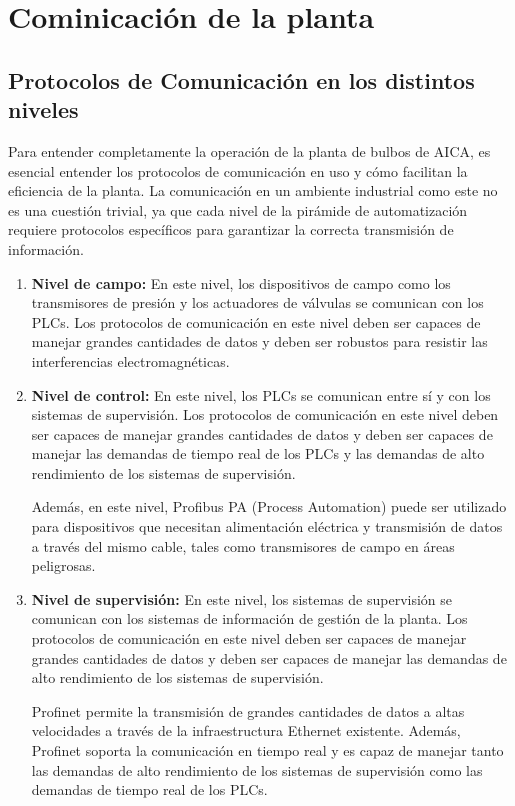 \section{Cominicación de la planta}
\subsection{Protocolos de Comunicación en los distintos niveles}

Para entender completamente la operación de la planta de bulbos de AICA, es esencial entender los protocolos de comunicación en uso y cómo facilitan la eficiencia de la planta. La comunicación en un ambiente industrial como este no es una cuestión trivial, ya que cada nivel de la pirámide de automatización requiere protocolos específicos para garantizar la correcta transmisión de información.\\
\begin{enumerate}
    \item \textbf{Nivel de campo:} En este nivel, los dispositivos de campo
          como los transmisores de presión y los actuadores de válvulas se
          comunican con los PLCs. Los protocolos de comunicación en este nivel
          deben ser capaces de manejar grandes cantidades de datos y deben
          ser robustos para resistir las interferencias electromagnéticas.

    \item \textbf{Nivel de control:} En este nivel, los PLCs se comunican entre
          sí y con los sistemas de supervisión. Los protocolos de comunicación en
          este nivel deben ser capaces de manejar grandes cantidades de datos y
          deben ser capaces de manejar las demandas de tiempo real de los PLCs y
          las demandas de alto rendimiento de los sistemas de supervisión.

          Además, en este nivel, Profibus PA (Process Automation) puede ser
          utilizado para dispositivos que necesitan alimentación eléctrica y
          transmisión de datos a través del mismo cable, tales como transmisores
          de campo en áreas peligrosas.


    \item \textbf{Nivel de supervisión:} En este nivel, los sistemas de
          supervisión se comunican con los sistemas de información de gestión
          de la planta. Los protocolos de comunicación en este nivel deben ser
          capaces de manejar grandes cantidades de datos y deben ser capaces de
          manejar las demandas de alto rendimiento de los sistemas de supervisión.

          Profinet permite la transmisión de grandes cantidades de datos a altas
          velocidades a través de la infraestructura Ethernet existente. Además,
          Profinet soporta la comunicación en tiempo real y es capaz de manejar
          tanto las demandas de alto rendimiento de los sistemas de supervisión
          como las demandas de tiempo real de los PLCs.

\end{enumerate}


